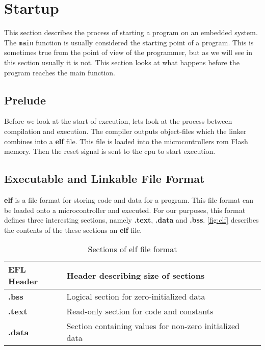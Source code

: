 \section{Startup}
\label{sec:back:startup}

This section describes the process of starting a program on an embedded system.
The \texttt{main} function is usually considered the starting point of a program.
This is sometimes true from the point of view of the programmer, but as we will see in this section usually it is not.
This section looks at what happens before the program reaches the main function.

\subsection{Prelude}

Before we look at the start of execution, lets look at the process between compilation and execution.
The compiler outputs object-files which the linker combines into a \textbf{elf} file.
This file is loaded into the microcontrollers \gls{rom} Flash memory.
Then the reset signal is sent to the \gls{cpu} to start execution.

\subsection{Executable and Linkable File Format}
\textbf{elf} is a file format for storing code and data for a program.
This file format can be loaded onto a microcontroller and executed.
For our purposes, this format defines three interesting sections, namely \textbf{.text}, \textbf{.data} and \textbf{.bss}.
\autoref{fig:elf} describes the contents of the these sections an \textbf{elf} file.

\begin{table}[H]
  \centering
  \begin{tabular}{|l|l|}
    \hline
    EFL Header & Header describing size of sections \\
    \hline
    \textbf{.bss} & Logical section for zero-initialized data \\
    \hline
    \textbf{.text} & Read-only section for code and constants \\
    \hline
    \textbf{.data} & Section containing values for non-zero initialized data \\
    \hline
  \end{tabular}
  \caption{Sections of elf file format}
  \label{fig:elf}
\end{table}

